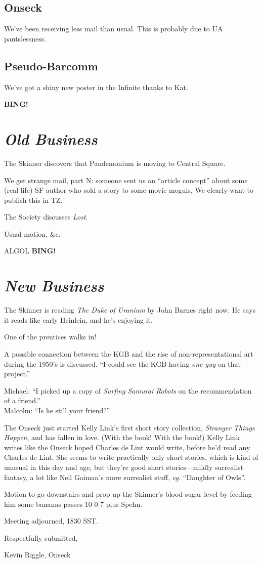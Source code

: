 \documentclass[10pt]{article}
\newcommand{\bing}{{\bf BING!} }
\newcommand{\goto}[1]{\bing \vskip 12pt \section*{{\em{#1}}}}
\newcommand{\ps}{ plus Spehn\xspace}
\begin{document}
\subsection*{Onseck}
We've been receiving less mail than usual.  This is probably due to UA pantslessness.


\subsection*{Pseudo-Barcomm}
We've got a shiny new poster in the Infinite thanks to Kat.

\goto{Old Business}

The Skinner discovers that Pandemonium is moving to Central Square.

We get strange mail, part N: someone sent us an ``article concept'' about some (real life) SF 
author who sold a story to some movie moguls.  We clearly want to publish this in TZ.

The Society discusses \emph{Lost}.

Usual motion, &c.

ALGOL
\goto{New Business}

The Skinner is reading \emph{The Duke of Uranium} by John Barnes right now.  He says it reads
like early Heinlein, and he's enjoying it.

One of the prentices walks in!

A possible connection between the KGB and the rise of non-representational art during the
1950's is discussed.  ``I could see the KGB having \emph{one guy} on that project.''

Michael: ``I picked up a copy of \emph{Surfing Samurai Robots} on the recommendation of a friend.''\\
Malcolm: ``Is he still your friend?''

The Onseck just started Kelly Link's first short story collection, \emph{Stranger Things Happen},
and has fallen in love.  (With the book!  With the book!)  Kelly Link writes like the Onseck 
hoped Charles de Lint would write, before he'd read any Charles de Lint.  She seems to write 
practically only short stories, which is kind of unusual in this day and age, but they're good
short stories---mildly surrealist fantasy, a lot like Neil Gaiman's more surrealist stuff, 
\emph{eg.} ``Daughter of Owls''.

Motion to go downstairs and prop up the Skinner's blood-sugar level by feeding him some bananas 
passes 10-0-7\ps.

\vspace{12pt}

\noindent
Meeting adjourned, 1830 SST.

\vspace{18pt}

\centerline{Respectfully submitted,}
\centerline{Kevin Riggle, Onseck}
\end{document}
